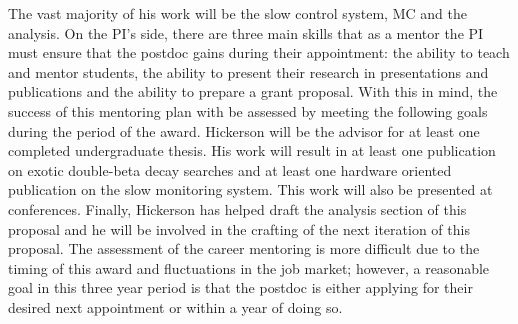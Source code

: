 The vast majority of his work will be the slow control system, MC and the analysis. On the PI's side, there are three main skills that as a mentor the PI must  ensure that the postdoc gains during their appointment: the ability to teach and mentor students, the ability to present their research in presentations and publications and the ability to prepare a grant proposal. With this in mind, the success of this mentoring plan with be assessed by meeting the following goals during the period of the award. Hickerson will be the advisor for at least one completed undergraduate thesis. His work will result in at least one publication on exotic double-beta decay searches and at least one hardware oriented publication on the slow monitoring system. This work will also be presented at conferences. Finally, Hickerson has helped draft the analysis section of this proposal and he will be involved in the crafting of the next iteration of this proposal.  The assessment of the career mentoring is more difficult due to the timing of this award and fluctuations in the job market; however, a reasonable goal in this three year period is that the postdoc is either applying for their desired next appointment or within a year of doing so.
 
